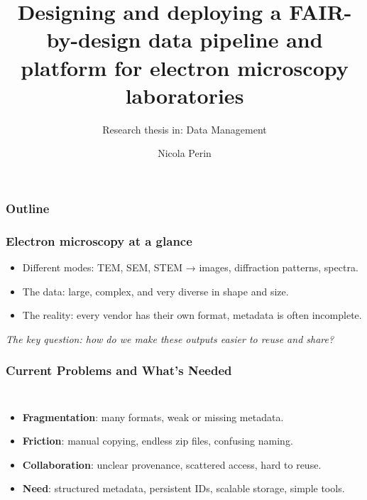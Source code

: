 \documentclass{beamer}
\title[FAIR-by-design EM pipeline]{Designing and deploying a FAIR-by-design data pipeline and platform for electron microscopy laboratories}
\subtitle{Research thesis in: Data Management}
\institute{University of Trieste}
\author[Nicola Perin]{Nicola Perin}
\begin{document}
	
	
	\begin{frame}
		\setTitlestyleDissertation
		\maketitle
	\end{frame}
	
	\begin{frame}
		\frametitle{Outline}
	\end{frame}
	
	
	
	\begin{frame}
		\frametitle{Electron microscopy at a glance}
		\begin{itemize}
			\item Different modes: TEM, SEM, STEM → images, diffraction patterns, spectra.
			\item The data: large, complex, and very diverse in shape and size.
			\item The reality: every vendor has their own format, metadata is often incomplete.
		\end{itemize}
		\vspace{0.5em}
		\small\textit{The key question: how do we make these outputs easier to reuse and share?}
	\end{frame}
	
	\begin{frame}
		\frametitle{Current Problems and What’s Needed}
		\begin{columns}[T,totalwidth=\textwidth]
			\column{0.58\textwidth}
			\begin{itemize}
				\item \textbf{Fragmentation}: many formats, weak or missing metadata.
				\item \textbf{Friction}: manual copying, endless zip files, confusing naming.
				\item \textbf{Collaboration}: unclear provenance, scattered access, hard to reuse.
				\item \textbf{Need}: structured metadata, persistent IDs, scalable storage, simple tools.
			\end{itemize}
			\column{0.42\textwidth}
		\end{columns}
	\end{frame}
	
\end{document}

